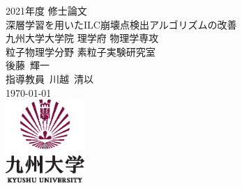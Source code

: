 \documentclass[12pt, openany]{jsbook}
\begin{document}
\begin{titlepage}
 \begin{center}
  {\Large 2021年度 修士論文} \\ 
  \vspace*{125pt}
  {\Large 深層学習を用いたILC崩壊点検出アルゴリズムの改善}\\[11pt]
  {\large 九州大学大学院 理学府 物理学専攻 \\ 粒子物理学分野 素粒子実験研究室} \\[15pt]
  \vspace{40pt}
  {\large  後藤\ 輝一 \\[1ex] 指導教員\ 川越\ 清以 } \\[1em]
  \today\\
 \vspace{100pt}
  \includegraphics[width=3cm]{Figure/1Introduction/KyushuUniversityLogo.eps}
 \end{center}
\end{titlepage}

\thispagestyle{empty}　\newpage

\thispagestyle{empty}　\newpage
\pagestyle{headings}
\tableofcontents
\listoffigures
\listoftables












\end{document}
